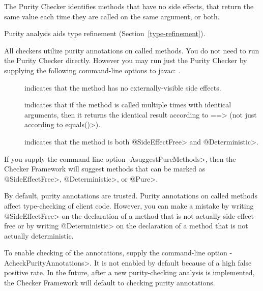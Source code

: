 \htmlhr
{}

The Purity Checker identifies methods that have no side effects, that
return the same value each time they are called on the same argument, or both.

Purity analysis aids type refinement (Section~\ref{type-refinement}).

All checkers utilize purity annotations on called methods.
You do not need to run the Purity Checker directly.
However you may run just the Purity Checker by
supplying the following command-line options to javac:
.



\begin{description}

\item[]
  indicates that the method has no externally-visible side effects.

\item[]
  indicates that if the method is called multiple times with identical
  arguments, then it returns the identical result according to \<==>
  (not just according to \<equals()>).

\item[]
  indicates that the method is both \<@SideEffectFree> and \<@Deterministic>.

\end{description}

If you supply the command-line option \<-AsuggestPureMethods>, then the
Checker Framework will suggest methods that can be marked as
\<@SideEffectFree>, \<@Deterministic>, or \<@Pure>.



By default, purity annotations are trusted.  Purity annotations on called
methods affect type-checking of client code.  However, you can make a
mistake by writing \<@SideEffectFree> on the declaration of a method that
is not actually side-effect-free or by writing \<@Deterministic> on the
declaration of a method that is not actually deterministic.

To enable
checking of the annotations, supply the command-line option
\<-AcheckPurityAnnotations>.  It is not enabled by default because of a high false
positive rate.  In the future, after a new purity-checking analysis is
implemented, the Checker Framework will default to checking purity
annotations.


